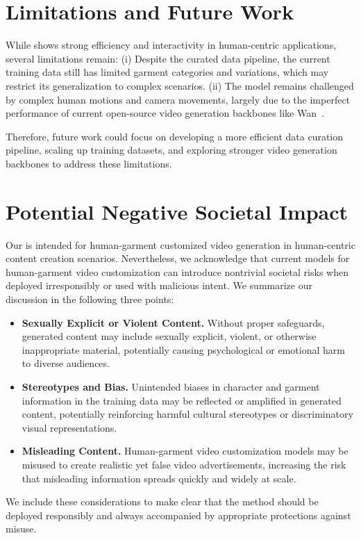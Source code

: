 \section{Limitations and Future Work}
%
While \method shows strong efficiency and interactivity in human-centric applications, several limitations remain: 
% 
(i) Despite the curated data pipeline, the current training data still has limited garment categories and variations, which may restrict its generalization to complex scenarios.
% 
(ii) The model remains challenged by complex human motions and camera movements, largely due to the imperfect performance of current open-source video generation backbones like Wan~\cite{wan2025wan}.


Therefore, future work could focus on developing a more efficient data curation pipeline, scaling up training datasets, and exploring stronger video generation backbones to address these limitations.



\section{Potential Negative Societal Impact}
%
Our \method is intended for human-garment customized video generation in human-centric content creation scenarios.
Nevertheless, we acknowledge that current models for human-garment video customization can introduce nontrivial societal risks when deployed irresponsibly or used with malicious intent.
% 
We summarize our discussion in the following three points:
% 
\begin{itemize}
    \item \textbf{Sexually Explicit or Violent Content.} Without proper safeguards, generated content may include sexually explicit, violent, or otherwise inappropriate material, potentially causing psychological or emotional harm to diverse audiences.
    \item \textbf{Stereotypes and Bias.} Unintended biases in character and garment information in the training data may be reflected or amplified in generated content, potentially reinforcing harmful cultural stereotypes or discriminatory visual representations.
    \item \textbf{Misleading Content.} Human-garment video customization models may be misused to create realistic yet false video advertisements, increasing the risk that misleading information spreads quickly and widely at scale.
\end{itemize}
% 
We include these considerations to make clear that the method should be deployed responsibly and always accompanied by appropriate protections against misuse.




